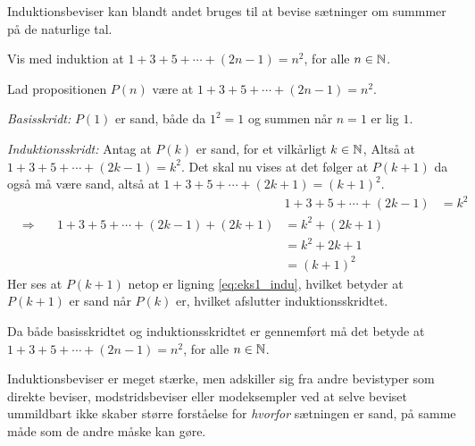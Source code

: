 Induktionsbeviser kan blandt andet bruges til at bevise sætninger om summmer på de naturlige tal.
\begin{exmp}
	Vis med induktion at $1 + 3 + 5 + \dotsb + (2n-1) = n^2$, for alle $n \in \mathbb{N}$.

	Lad propositionen $P(n)$ være at $1 + 3 + 5 + \dotsb + (2n-1) = n^2$.
	
	\textit{Basisskridt:} $P(1)$ er sand, både da $1^2 = 1$ og summen når $n = 1$ er lig $1$.

	\textit{Induktionsskridt:} Antag at $P(k)$ er sand, for et vilkårligt $k \in \mathbb{N}$, Altså at $1 + 3 + 5 + \dotsb + (2k-1) = k^2$.
	Det skal nu vises at det følger at $P(k + 1)$ da også må være sand, altså at $1 + 3 + 5 + \dotsb + (2k+1) = \left( k + 1 \right) ^2$.
	\begin{alignat}
		&&&1 + 3 + 5 + \dotsb + (2k-1) 
		&= k^2 \nonumber \\
		&\Rightarrow \quad
		&1 + 3 + 5 + \dotsb + (2k-1) + (2k+1) 
		&= k^2 + (2k + 1) \nonumber \\
		&&&= k^2 + 2k + 1 \nonumber \\
		&&&= \left( k + 1 \right) ^2 \label{eq:eks1_indu}
	\end{alignat}
	Her ses at $P(k + 1)$ netop er ligning \eqref{eq:eks1_indu}, hvilket betyder at $P(k + 1)$ er sand når $P(k)$ er, hvilket afslutter induktionsskridtet.

	Da både basisskridtet og induktionsskridtet er gennemført må det betyde at $1 + 3 + 5 + \dotsb + (2n-1) = n^2$, for alle $n \in \mathbb{N}$.
\end{exmp}

Induktionsbeviser er meget stærke, men adskiller sig fra andre bevistyper som direkte beviser, modstridsbeviser eller modeksempler ved at selve beviset ummildbart ikke skaber større forståelse for \textit{hvorfor} sætningen er sand, på samme måde som de andre måske kan gøre.

